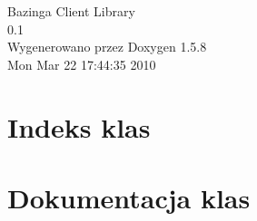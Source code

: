 \documentclass[a4paper]{book}
\begin{document}
\begin{titlepage}
\vspace*{7cm}
\begin{center}
{\Large Bazinga Client Library \\[1ex]\large 0.1 }\\
\vspace*{1cm}
{\large Wygenerowano przez Doxygen 1.5.8}\\
\vspace*{0.5cm}
{\small Mon Mar 22 17:44:35 2010}\\
\end{center}
\end{titlepage}
\clearemptydoublepage
{}
\tableofcontents
\clearemptydoublepage
{}
\chapter{Indeks klas}

\chapter{Dokumentacja klas}







\printindex
\end{document}
